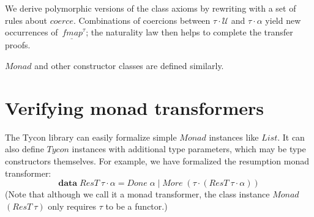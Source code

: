 \documentclass{sigplanconf}
\newcommand{\U}{\ensuremath{\mathcal{U}}}
\newcommand{\univ}[1]{\ensuremath{\underline{#1}}}
\newcommand{\kwd}[1]{\mathbf{#1}}
\newcommand{\hsc}[1]{\ensuremath{\mathit{#1}}}
\newcommand{\hscoerce}{\hsc{coerce}}
\newcommand{\fmap}{\,\hsc{fmap}} %
\newcommand{\fmapU}{\univ{\fmap}}
\newcommand{\tA}{\alpha}
\newcommand{\tT}{\tau}
\theoremstyle{definition}
\begin{document}
We derive polymorphic versions of the class axioms by rewriting with a set of rules about $\hscoerce$. Combinations of coercions between $\tT\cdot\U$ and $\tT\cdot\tA$ yield new occurrences of $\fmapU^\tT$; the naturality law then helps to complete the transfer proofs.

\hsc{Monad} and other constructor classes are defined similarly.

\begin{comment}
\section{Instantiating type constructor classes}
\label{sec:instantiation}

To facilitate the definition of \hsc{Functor} class instances, the Tycon library provides a new user-level type definition command. It provides the same set of features as the HOLCF Domain package, and is implemented using much of the same code. The difference is that the type being defined can be expressed using the type application operator, so that it generates a \hsc{Tycon} instance. For example:
%
\begin{equation*}
\kwd{data}\:\hsc{List}\cdot\tA = \hsc{Nil} \mid \hsc{Cons}\:\tA\:(\hsc{List}\cdot\tA)
\end{equation*}

The command automatically defines $\fmapU$ and proves the functor identity law, yielding a \hsc{Prefunctor} instance---a version of class \hsc{Functor} without the composition law. It is not always possible to automatically prove the composition law, because it can fail for some strict datatypes; thus we leave it to the user to prove it separately. Further subclass instances like \hsc{Monad} require no special tools or techniques.
\end{comment}
\section{Verifying monad transformers}
\label{sec:monad-transformers}

The Tycon library can easily formalize simple \hsc{Monad} instances like \hsc{List}. It can also define \hsc{Tycon} instances with additional type parameters, which may be type constructors themselves. For example, we have formalized the resumption monad transformer: %
%
\begin{equation*}
\kwd{data}\;\hsc{ResT}\:\tT\cdot\tA = \hsc{Done}\;\tA \mid \hsc{More}\;(\tT\cdot(\hsc{ResT}\:\tT\cdot\tA))
\end{equation*}
%
(Note that although we call it a monad transformer, the class instance \hsc{Monad} $(\hsc{ResT}\:\tT)$ only requires $\tT$ to be a functor.)
\end{document}

